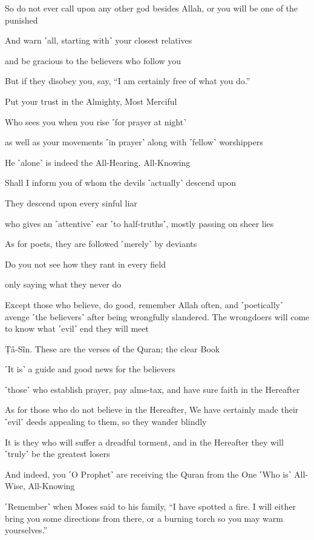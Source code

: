 So do not ever call upon any other god besides Allah, or you will be one of the punished

And warn ˹all, starting with˺ your closest relatives

and be gracious to the believers who follow you

But if they disobey you, say, “I am certainly free of what you do.”

Put your trust in the Almighty, Most Merciful

Who sees you when you rise ˹for prayer at night˺

as well as your movements ˹in prayer˺ along with ˹fellow˺ worshippers

He ˹alone˺ is indeed the All-Hearing, All-Knowing

Shall I inform you of whom the devils ˹actually˺ descend upon

They descend upon every sinful liar

who gives an ˹attentive˺ ear ˹to half-truths˺, mostly passing on sheer lies

As for poets, they are followed ˹merely˺ by deviants

Do you not see how they rant in every field

only saying what they never do

Except those who believe, do good, remember Allah often, and ˹poetically˺ avenge ˹the believers˺ after being wrongfully slandered. The wrongdoers will come to know what ˹evil˺ end they will meet

Ṭâ-Sĩn. These are the verses of the Quran; the clear Book

˹It is˺ a guide and good news for the believers

˹those˺ who establish prayer, pay alms-tax, and have sure faith in the Hereafter

As for those who do not believe in the Hereafter, We have certainly made their ˹evil˺ deeds appealing to them, so they wander blindly

It is they who will suffer a dreadful torment, and in the Hereafter they will ˹truly˺ be the greatest losers

And indeed, you ˹O Prophet˺ are receiving the Quran from the One ˹Who is˺ All-Wise, All-Knowing

˹Remember˺ when Moses said to his family, “I have spotted a fire. I will either bring you some directions from there, or a burning torch so you may warm yourselves.”

